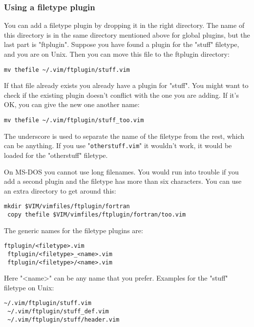 \subsubsection{Using a filetype plugin}
\label{ftplugin-name}

You can add a filetype plugin by dropping it in the right directory.
The name of this directory is in the same directory mentioned above for global plugins, but the last part is "ftplugin".
Suppose you have found a plugin for the "stuff" filetype, and you are on Unix.
Then you can move this file to the ftplugin directory:

 \begin{Verbatim}[samepage=true]
 mv thefile ~/.vim/ftplugin/stuff.vim
 \end{Verbatim}

If that file already exists you already have a plugin for "stuff".
You might want to check if the existing plugin doesn't conflict with the one you are adding.
If it's OK, you can give the new one another name:

 \begin{Verbatim}[samepage=true]
 mv thefile ~/.vim/ftplugin/stuff_too.vim
 \end{Verbatim}

The underscore is used to separate the name of the filetype from the rest, which can be anything.
If you use "\verb!otherstuff.vim!" it wouldn't work, it would be loaded for the "otherstuff" filetype.

On MS-DOS you cannot use long filenames.
You would run into trouble if you add a second plugin and the filetype has more than six characters.
You can use an extra directory to get around this:

 \begin{Verbatim}[samepage=true]
 mkdir $VIM/vimfiles/ftplugin/fortran
 copy thefile $VIM/vimfiles/ftplugin/fortran/too.vim
 \end{Verbatim}

The generic names for the filetype plugins are:

 \begin{Verbatim}[samepage=true]
 ftplugin/<filetype>.vim
 ftplugin/<filetype>_<name>.vim
 ftplugin/<filetype>/<name>.vim
 \end{Verbatim}

Here "<name>" can be any name that you prefer.
Examples for the "stuff" filetype on Unix:

 \begin{Verbatim}[samepage=true]
 ~/.vim/ftplugin/stuff.vim
 ~/.vim/ftplugin/stuff_def.vim
 ~/.vim/ftplugin/stuff/header.vim
 \end{Verbatim}

